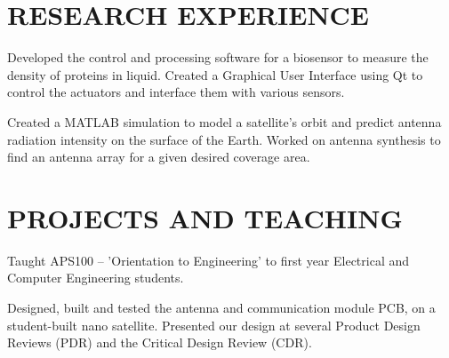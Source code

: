 \documentclass{ResumeTemplate}
\begin{document}
	\section{RESEARCH EXPERIENCE}
	

	\workitemstwo
	{Developed the control and processing software for a biosensor to measure the density of proteins in liquid.}
	{Created a Graphical User Interface using Qt to control the actuators and interface them with various sensors.}
	

	\workitemsone
	{Created a MATLAB simulation to model a satellite's orbit and predict antenna radiation intensity on the surface of the Earth. Worked on antenna synthesis to find an antenna array for a given desired coverage area.}
	
	\section{PROJECTS AND TEACHING}
	

	\workitemsone
	{Taught APS100 -- 'Orientation to Engineering' to first year Electrical and Computer Engineering students.}
	

	\workitemstwo
	{Designed, built and tested the antenna and communication module PCB, on a student-built nano satellite.}
	{Presented our design at several Product Design Reviews (PDR) and the Critical Design Review (CDR).}

	
\end{document}
